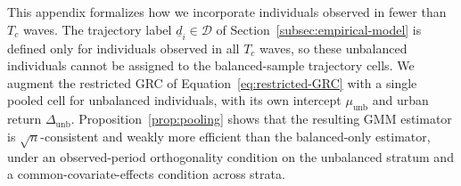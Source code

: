 %

This appendix formalizes how we incorporate individuals observed in fewer than $T_c$ waves.
The trajectory label $\underline d_i \in \mathcal D$ of Section~\ref{subsec:empirical-model} is defined only for individuals observed in all $T_c$ waves, so these unbalanced individuals cannot be assigned to the balanced-sample trajectory cells.
We augment the restricted GRC of Equation~\eqref{eq:restricted-GRC} with a single pooled cell for unbalanced individuals, with its own intercept $\mu_{\mathrm{unb}}$ and urban return $\Delta_{\mathrm{unb}}$.
Proposition~\ref{prop:pooling} shows that the resulting GMM estimator is $\sqrt n$-consistent and weakly more efficient than the balanced-only estimator, under an observed-period orthogonality condition on the unbalanced stratum and a common-covariate-effects condition across strata.


